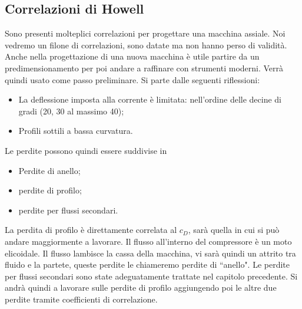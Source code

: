 \subsection{Correlazioni di Howell}
Sono presenti molteplici correlazioni per progettare una macchina assiale. Noi vedremo un filone di correlazioni, sono datate ma non hanno perso di validità. Anche nella progettazione di una nuova macchina è utile partire da un predimensionamento per poi andare a raffinare con strumenti moderni. Verrà quindi usato come passo preliminare.
Si parte dalle seguenti riflessioni:
\begin{itemize}
\item La deflessione imposta alla corrente è limitata: nell'ordine delle decine di gradi (20, 30 al massimo 40);
\item Profili sottili a bassa curvatura.
\end{itemize}
Le perdite possono quindi essere suddivise in 
\begin{itemize}
\item Perdite di anello;
\item perdite di profilo;
\item perdite per flussi secondari.
\end{itemize}
La perdita di profilo è direttamente correlata al $c_D$, sarà quella in cui si può andare maggiormente a lavorare. 
Il flusso all'interno del compressore è un moto elicoidale. Il flusso lambisce la cassa della macchina, vi sarà quindi un attrito tra fluido e la partete, queste perdite le chiameremo perdite di ``anello".
Le perdite per flussi secondari sono state adeguatamente trattate nel capitolo precedente. 
Si andrà quindi a lavorare sulle perdite di profilo aggiungendo poi le altre due perdite tramite coefficienti di correlazione.

